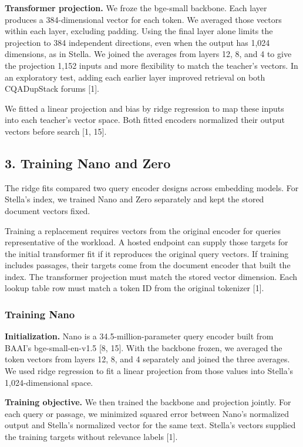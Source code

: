 \documentclass[
  english,
  10pt,
]{article}
\begin{document}
\textbf{Transformer projection.} We froze the bge-small backbone. Each
layer produces a 384-dimensional vector for each token. We averaged
those vectors within each layer, excluding padding. Using the final
layer alone limits the projection to 384 independent directions, even
when the output has 1,024 dimensions, as in Stella. We joined the
averages from layers 12, 8, and 4 to give the projection 1,152 inputs
and more flexibility to match the teacher's vectors. In an exploratory
test, adding each earlier layer improved retrieval on both CQADupStack
forums {[}1{]}.

We fitted a linear projection and bias by ridge regression to map these
inputs into each teacher's vector space. Both fitted encoders normalized
their output vectors before search {[}1, 15{]}.

\subsection{3. Training Nano and Zero}\label{training-nano-and-zero}

The ridge fits compared two query encoder designs across embedding
models. For Stella's index, we trained Nano and Zero separately and kept
the stored document vectors fixed.

Training a replacement requires vectors from the original encoder for
queries representative of the workload. A hosted endpoint can supply
those targets for the initial transformer fit if it reproduces the
original query vectors. If training includes passages, their targets
come from the document encoder that built the index. The transformer
projection must match the stored vector dimension. Each lookup table row
must match a token ID from the original tokenizer {[}1{]}.

\subsubsection{Training Nano}\label{training-nano}

\textbf{Initialization.} Nano is a 34.5-million-parameter query encoder
built from BAAI's bge-small-en-v1.5 {[}8, 15{]}. With the backbone
frozen, we averaged the token vectors from layers 12, 8, and 4
separately and joined the three averages. We used ridge regression to
fit a linear projection from those values into Stella's
1,024-dimensional space.

\textbf{Training objective.} We then trained the backbone and projection
jointly. For each query or passage, we minimized squared error between
Nano's normalized output and Stella's normalized vector for the same
text. Stella's vectors supplied the training targets without relevance
labels {[}1{]}.
\end{document}
